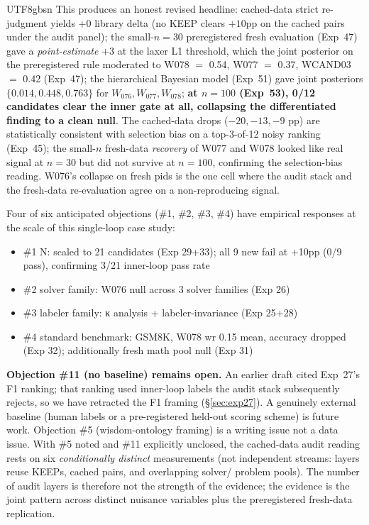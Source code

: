 \documentclass{article}
\begin{document}
\begin{CJK*}{UTF8}{gbsn}
This produces an honest revised headline: cached-data strict
re-judgment yields \(\boxed{+0}\) library delta (no KEEP clears
\(+10\)pp on the cached pairs under the audit panel); the
small-\(n=30\) preregistered fresh evaluation (Exp~47) gave a
\emph{point-estimate} \(\boxed{+3}\) at the laxer L1 threshold,
which the joint posterior on the preregistered rule moderated to
W078 \(=\) 0.54, W077 \(=\) 0.37, WCAND03 \(=\) 0.42 (Exp~47);
the hierarchical Bayesian model (Exp~51) gave joint posteriors
\(\{0.014, 0.448, 0.763\}\) for \(W_{076}, W_{077}, W_{078}\);
\textbf{at \(n=100\) (Exp~53), 0/12 candidates clear the inner
gate at all, collapsing the differentiated finding to a clean
null}. The cached-data drops (\(-20, -13, -9\) pp) are
statistically consistent with selection bias on a top-3-of-12
noisy ranking (Exp~45); the small-\(n\) fresh-data
\emph{recovery} of W077 and W078 looked like real signal at
\(n=30\) but did not survive at \(n=100\), confirming the
selection-bias reading. W076's
collapse on fresh pids is the one cell where the audit stack and
the fresh-data re-evaluation agree on a non-reproducing signal.

Four of six anticipated objections (\#1, \#2, \#3, \#4) have
empirical responses at the scale of this single-loop case study:

\begin{itemize}[leftmargin=*, topsep=2pt, itemsep=1pt]
  \item \#1 N: scaled to 21 candidates (Exp 29+33); all 9 new
    fail at +10pp (0/9 pass), confirming 3/21 inner-loop pass rate
  \item \#2 solver family: W076 null across 3 solver families
    (Exp 26)
  \item \#3 labeler family: κ analysis + labeler-invariance
    (Exp 25+28)
  \item \#4 standard benchmark: GSM8K, W078 wr 0.15 mean,
    accuracy dropped (Exp 32); additionally fresh math pool
    null (Exp 31)
\end{itemize}

\textbf{Objection \#11 (no baseline) remains open.} An earlier
draft cited Exp~27's F1 ranking; that ranking used inner-loop
labels the audit stack subsequently rejects, so we have retracted
the F1 framing (\S\ref{sec:exp27}). A genuinely external baseline
(human labels or a pre-registered held-out scoring scheme) is
future work. Objection \#5 (wisdom-ontology framing) is a
writing issue not a data issue. With \#5 noted and \#11 explicitly
unclosed, the cached-data audit reading rests on six
\emph{conditionally distinct} measurements (not independent
streams: layers reuse KEEPs, cached pairs, and overlapping solver/
problem pools). The number of audit layers is therefore not the
strength of the evidence; the evidence is the joint pattern across
distinct nuisance variables plus the preregistered fresh-data
replication.


\end{CJK*}
\end{document}
